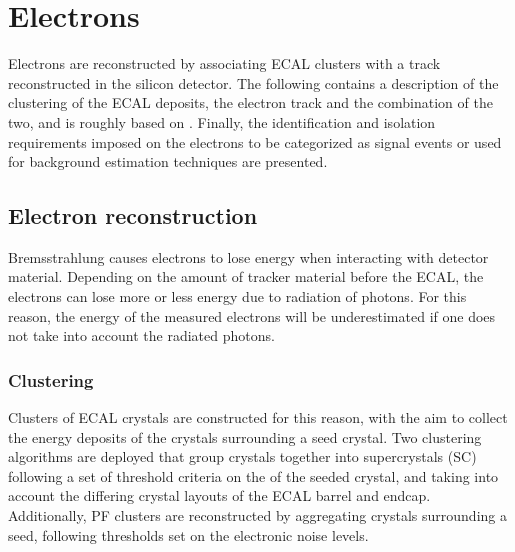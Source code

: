 \section{Electrons}
\noindent\justify
\label{subsub:electrons}
Electrons are reconstructed by associating ECAL clusters with a track reconstructed in the silicon detector. 
The following contains a description of the clustering of the ECAL deposits, the electron track and the combination of the two, and is roughly based on \cite{Khachatryan:2015hwa}. 
Finally, the identification and isolation requirements imposed on the electrons to be categorized as signal events or used for background estimation techniques are presented. 
\subsection*{Electron reconstruction}
\noindent\justify
Bremsstrahlung causes electrons to lose energy when interacting with detector material. 
Depending on the amount of tracker material before the ECAL, the electrons can lose more or less energy due to radiation of photons. 
For this reason, the energy of the measured electrons will be underestimated if one does not take into account the radiated photons. 
\subsubsection*{Clustering}
\noindent\justify
Clusters of ECAL crystals are constructed for this reason, with the aim to collect the energy deposits of the crystals surrounding a seed crystal. 
Two clustering algorithms are deployed that group crystals together into supercrystals (SC) following a set of threshold criteria on the \ET of the seeded crystal, and taking into account the differing crystal layouts of the ECAL barrel and endcap.   
Additionally, PF clusters are reconstructed by aggregating crystals surrounding a seed, following thresholds set on the electronic noise levels.  
